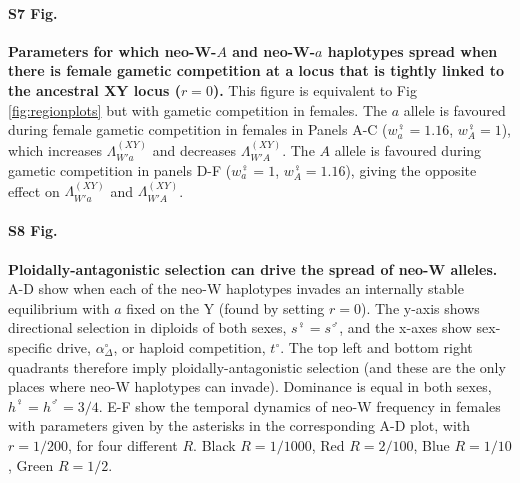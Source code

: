 \documentclass[10pt,letterpaper]{article}
\begin{document}
\paragraph*{S7 Fig.}
\label{fig:regionFemaleGS}
{\bf Parameters for which neo-W-$A$ and neo-W-$a$ haplotypes spread when there is female gametic competition at a locus that is tightly linked to the ancestral XY locus ($r=0$).}
This figure is equivalent to Fig \ref{fig:regionplots} but with gametic competition in females.
The $a$ allele is favoured during female gametic competition in females in Panels A-C ($w_{a}^\female=1.16$, $w_{A}^\female=1$), which increases $\Lambda_{W'a}^{(XY)}$ and decreases $\Lambda_{W'A}^{(XY)}$. 
The $A$ allele is favoured during gametic competition in panels D-F ($w_{a}^\female=1$, $w_{A}^\female=1.16$), giving the opposite effect on $\Lambda_{W'a}^{(XY)}$ and $\Lambda_{W'A}^{(XY)}$. 

\paragraph*{S8 Fig.}
\label{fig:regionPloidAntag}
{\bf Ploidally-antagonistic selection can drive the spread of neo-W alleles. }
A-D show when each of the neo-W haplotypes invades an internally stable equilibrium with $a$ fixed on the Y (found by setting $r=0$).
The y-axis shows directional selection in diploids of both sexes, $s^\female=s^\male$, and the x-axes show sex-specific drive, $\alpha_\Delta^\circ$, or haploid competition, $t^\circ$.
The top left and bottom right quadrants therefore imply ploidally-antagonistic selection (and these are the only places where neo-W haplotypes can invade).
Dominance is equal in both sexes, $h^\female=h^\male=3/4$. 
E-F show the temporal dynamics of neo-W frequency in females with parameters given by the asterisks in the corresponding A-D plot, with $r=1/200$, for four different $R$.
Black $R=1/1000$, Red $R=2/100$, Blue $R=1/10$, Green $R=1/2$.  
\end{document}
